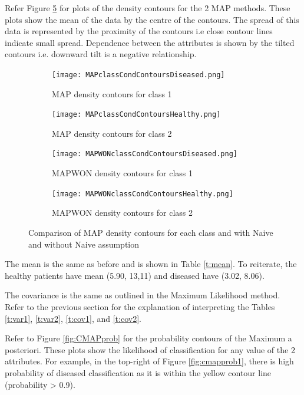 Refer Figure \ref{fig:CMAPdens} for plots of the density contours for the 2 MAP methods. These plots show the mean of the data by the centre of the contours. The spread of this data is represented by the proximity of the contours i.e close contour lines indicate small spread. Dependence between the attributes is shown by the tilted contours i.e. downward tilt is a negative relationship.

\begin{figure}[h!] 
	\centering
	\begin{subfigure}[b]{.49\textwidth}
		\texttt{[image: MAPclassCondContoursDiseased.png]}
		\caption{MAP density contours for class 1}
		\label{fig:model0}
	\end{subfigure}
	\begin{subfigure}[b]{.49\textwidth}
		\texttt{[image: MAPclassCondContoursHealthy.png]}
		\caption{MAP density contours for class 2}
		\label{fig:model1}
	\end{subfigure}
	\begin{subfigure}[b]{.49\textwidth}
		\texttt{[image: MAPWONclassCondContoursDiseased.png]}
		\caption{MAPWON density contours for class 1}
		\label{fig:model2}
	\end{subfigure}
	\begin{subfigure}[b]{.49\textwidth}
		\texttt{[image: MAPWONclassCondContoursHealthy.png]}
		\caption{MAPWON density contours for class 2}
		\label{fig:model3}
	\end{subfigure}
	\caption{Comparison of MAP density contours for each class and with Naive and without Naive assumption}
	\label{fig:CMAPdens}
\end{figure}

The mean is the same as before and is shown in Table \ref{t:mean}. To reiterate, the healthy patients have mean (5.90, 13,11) and diseased have (3.02, 8.06).

The covariance is the same as outlined in the Maximum Likelihood method. Refer to the previous section for the explanation of interpreting the Tables \ref{t:var1}, \ref{t:var2}, \ref{t:cov1}, and \ref{t:cov2}.

Refer to Figure \ref{fig:CMAPprob} for the probability contours of the Maximum a posteriori. These plots show the likelihood of classification for any value of the 2 attributes. For example, in the top-right of Figure \ref{fig:cmapprob1}, there is high probability of diseased classification as it is within the yellow contour line (probability > 0.9). 

